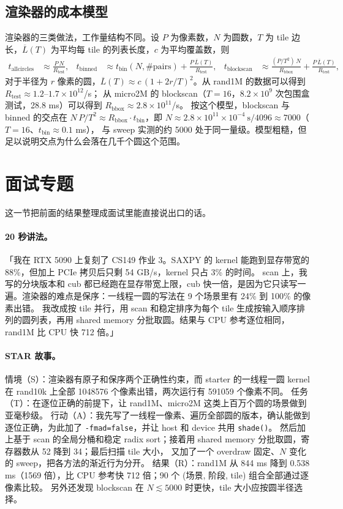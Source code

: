 \documentclass[11pt,a4paper]{ctexart}
\begin{document}
\subsection{渲染器的成本模型}
渲染器的三类做法，工作量结构不同。设 $P$ 为像素数，$N$ 为圆数，$T$ 为 tile 边长，$\overline{L}(T)$ 为平均每 tile 的列表长度，$c$ 为平均覆盖数，则
\begin{align*}
t_\text{allcircles} &\approx \frac{P\,N}{R_\text{test}}, &
t_\text{binned} &\approx t_\text{bin}(N,\#\text{pairs}) + \frac{P\,\overline{L}(T)}{R_\text{test}}, &
t_\text{blockscan} &\approx \frac{(P/T^2)\,N}{R_\text{bbox}} + \frac{P\,\overline{L}(T)}{R_\text{test}},
\end{align*}
对于半径为 $r$ 像素的圆，$\overline{L}(T)\approx c\,(1+2r/T)^2$。从 rand1M 的数据可以得到 $R_\text{test}\approx1.2$--$1.7\times10^{12}$/s；
从 micro2M 的 blockscan（$T=16$，$8.2\times10^9$ 次包围盒测试，28.8 ms）可以得到 $R_\text{bbox}\approx2.8\times10^{11}$/s。
按这个模型，blockscan 与 binned 的交点在 $N\,P/T^2\approx R_\text{bbox}\cdot t_\text{bin}$，即 $N\approx2.8\times10^{11}\times10^{-4}\ \text{s}/4096\approx7000$（$T=16$、$t_\text{bin}\approx0.1$ ms），
与 sweep 实测的约 5000 处于同一量级。模型粗糙，但足以说明交点为什么会落在几千个圆这个范围。

\section{面试专题}

这一节把前面的结果整理成面试里能直接说出口的话。

\paragraph{20 秒讲法。} 「我在 RTX 5090 上复刻了 CS149 作业 3。SAXPY 的 kernel 能跑到显存带宽的 88\%，但加上 PCIe 拷贝后只剩 54 GB/s，kernel 只占 3\% 的时间。
scan 上，我写的分块版本和 cub 都已经跑在显存带宽上限，cub 快一倍，是因为它只读写一遍。渲染器的难点是保序：一线程一圆的写法在 9 个场景里有 24\% 到 100\% 的像素出错。
我改成按 tile 并行，用 scan 和稳定排序为每个 tile 生成按输入顺序排列的圆列表，再用 shared memory 分批取圆。结果与 CPU 参考逐位相同，rand1M 比 CPU 快 712 倍。」

\paragraph{STAR 故事。}
情境（S）：渲染器有原子和保序两个正确性约束，而 starter 的一线程一圆 kernel 在 rand10k 上全部 1048576 个像素出错，两次运行有 591059 个像素不同。
任务（T）：在逐位正确的前提下，让 rand1M、micro2M 这类上百万个圆的场景做到亚毫秒级。
行动（A）：我先写了一线程一像素、遍历全部圆的版本，确认能做到逐位正确，为此加了 \texttt{-fmad=false}，并让 host 和 device 共用 \texttt{shade()}。
然后加上基于 scan 的全局分桶和稳定 radix sort；接着用 shared memory 分批取圆，寄存器数从 52 降到 34；最后扫描 tile 大小，
又加了一个 overdraw 固定、$N$ 变化的 sweep，把各方法的渐近行为分开。
结果（R）：rand1M 从 844 ms 降到 0.538 ms（1569 倍），比 CPU 参考快 712 倍；90 个 (场景, 阶段, tile) 组合全部通过逐像素比较。
另外还发现 blockscan 在 $N\lesssim5000$ 时更快，tile 大小应按圆半径选择。
\end{document}
